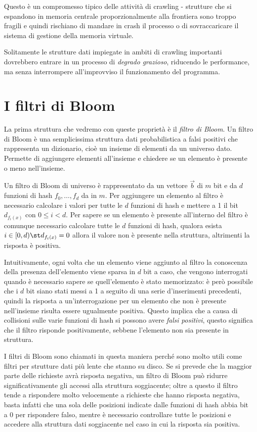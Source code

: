 Questo è un compromesso tipico delle attività di crawling - strutture che si espandono in memoria centrale proporzionalmente alla frontiera sono troppo fragili e quindi rischiano di mandare in crash il processo o di sovraccaricare il sistema di gestione della memoria virtuale.

Solitamente le strutture dati impiegate in ambiti di crawling importanti dovrebbero entrare in un processo di \textit{degrado grazioso}, riducendo le performance, ma senza interrompere all'improvviso il funzionamento del programma.
\section{I filtri di Bloom}
La prima struttura che vedremo con queste proprietà è il \textit{filtro di Bloom}. Un filtro di Bloom \cite{Bloom} è una semplicissima struttura dati probabilistica a falsi positivi che rappresenta un dizionario, cioè un insieme di elementi da un universo dato. Permette di aggiungere elementi all'insieme e chiedere se un elemento è presente o meno nell'insieme.

Un filtro di Bloom di universo  è rappresentato da un vettore $\vec{b}$ di $m$ bit e da $d$ funzioni di hash $f_0, \dots, f_d$ da  in $m$. Per aggiungere un elemento al filtro è necessario calcolare i valori per tutte le $d$ funzioni di hash e mettere a 1 il bit $d_{f_i(x)}$ con $0 \leq i < d$. Per sapere se un elemento è presente all'interno del filtro è comunque necessario calcolare tutte le $d$ funzioni di hash, qualora esista $i \in [0, d) \st d_{f_i(x)} = 0$ allora il valore non è presente nella struttura, altrimenti la risposta è positiva.

Intuitivamente, ogni volta che un elemento viene aggiunto al filtro la conoscenza della presenza dell'elemento viene sparsa in $d$ bit a caso, che vengono interrogati quando è necessario sapere se quell'elemento è stato memorizzato: è però possibile che i $d$ bit siano stati messi a 1 a seguito di una serie d'inserimenti precedenti, quindi la risposta a un'interrogazione per un elemento che non è presente nell'insieme risulta essere ugualmente positiva. Questo implica che a causa di collisioni sulle varie funzioni di hash si possono avere \textit{falsi positivi}, questo significa che il filtro risponde positivamente, sebbene l'elemento non sia presente in struttura.

I filtri di Bloom sono chiamati in questa maniera perché sono molto utili come filtri per strutture dati più lente che stanno su disco. Se si prevede che la maggior parte delle richieste avrà risposta negativa, un filtro di Bloom può ridurre significativamente gli accessi alla struttura soggiacente; oltre a questo il filtro tende a rispondere molto velocemente a richieste che hanno risposta negativa, basta infatti che una sola delle posizioni indicate dalle funzioni di hash abbia bit a 0 per rispondere falso, mentre è necessario controllare tutte le posizioni e accedere alla struttura dati soggiacente nel caso in cui la risposta sia positiva.

